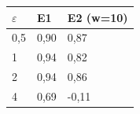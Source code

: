 \begin{tabular}{lll}
\toprule
$\varepsilon$ & E1 & E2 (w=10) \\
\midrule
0,5 & 0,90 & 0,87 \\
1 & 0,94 & 0,82 \\
2 & 0,94 & 0,86 \\
4 & 0,69 & -0,11 \\
\bottomrule
\end{tabular}
